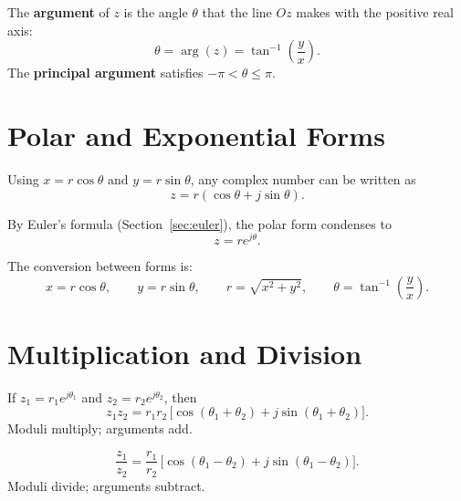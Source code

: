 \begin{definition}[Argument]
The \textbf{argument} of $z$ is the angle $\theta$ that the line $Oz$ makes with the
positive real axis:
\[
  \theta = \arg(z) = \tan^{-1}\!\left(\frac{y}{x}\right).
\]
The \textbf{principal argument} satisfies $-\pi < \theta \leq \pi$.
\end{definition}

\section{Polar and Exponential Forms}

\begin{definition}
Using $x = r\cos\theta$ and $y = r\sin\theta$, any complex number can be written as
\[
  z = r(\cos\theta + j\sin\theta).
\]
\end{definition}

\begin{definition}
By Euler's formula (Section~\ref{sec:euler}), the polar form condenses to
\[
  z = re^{j\theta}.
\]
\end{definition}

\begin{note}
The conversion between forms is:
\[
  x = r\cos\theta, \qquad y = r\sin\theta, \qquad
  r = \sqrt{x^2+y^2}, \qquad \theta = \tan^{-1}\!\!\left(\frac{y}{x}\right).
\]
\end{note}

\section{Multiplication and Division}

\begin{theorem}
If $z_1 = r_1 e^{j\theta_1}$ and $z_2 = r_2 e^{j\theta_2}$, then
\[
  z_1 z_2 = r_1 r_2\,\bigl[\cos(\theta_1+\theta_2) + j\sin(\theta_1+\theta_2)\bigr].
\]
Moduli multiply; arguments add.
\end{theorem}

\begin{theorem}
\[
  \frac{z_1}{z_2} = \frac{r_1}{r_2}\,\bigl[\cos(\theta_1-\theta_2) + j\sin(\theta_1-\theta_2)\bigr].
\]
Moduli divide; arguments subtract.
\end{theorem}

